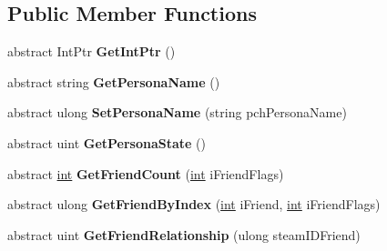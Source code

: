 \subsection*{Public Member Functions}
\begin{DoxyCompactItemize}
\item 
\hypertarget{classValve_1_1Steamworks_1_1ISteamFriends_addb8dee234b12715a1f9d60a2076c8b0}{}abstract Int\+Ptr {\bfseries Get\+Int\+Ptr} ()\label{classValve_1_1Steamworks_1_1ISteamFriends_addb8dee234b12715a1f9d60a2076c8b0}

\item 
\hypertarget{classValve_1_1Steamworks_1_1ISteamFriends_a2e4a7aa02bb0b7a4a651fda2425796df}{}abstract string {\bfseries Get\+Persona\+Name} ()\label{classValve_1_1Steamworks_1_1ISteamFriends_a2e4a7aa02bb0b7a4a651fda2425796df}

\item 
\hypertarget{classValve_1_1Steamworks_1_1ISteamFriends_a7aa0807c91ae882846cc8d69b2d803cf}{}abstract ulong {\bfseries Set\+Persona\+Name} (string pch\+Persona\+Name)\label{classValve_1_1Steamworks_1_1ISteamFriends_a7aa0807c91ae882846cc8d69b2d803cf}

\item 
\hypertarget{classValve_1_1Steamworks_1_1ISteamFriends_a119f400db8b21a57103441da835ad509}{}abstract uint {\bfseries Get\+Persona\+State} ()\label{classValve_1_1Steamworks_1_1ISteamFriends_a119f400db8b21a57103441da835ad509}

\item 
\hypertarget{classValve_1_1Steamworks_1_1ISteamFriends_aaa81d3f377380a8c459816e7ea03d88c}{}abstract \hyperlink{SDL__thread_8h_a6a64f9be4433e4de6e2f2f548cf3c08e}{int} {\bfseries Get\+Friend\+Count} (\hyperlink{SDL__thread_8h_a6a64f9be4433e4de6e2f2f548cf3c08e}{int} i\+Friend\+Flags)\label{classValve_1_1Steamworks_1_1ISteamFriends_aaa81d3f377380a8c459816e7ea03d88c}

\item 
\hypertarget{classValve_1_1Steamworks_1_1ISteamFriends_afcce033a23dd98f7820274dca185e1f6}{}abstract ulong {\bfseries Get\+Friend\+By\+Index} (\hyperlink{SDL__thread_8h_a6a64f9be4433e4de6e2f2f548cf3c08e}{int} i\+Friend, \hyperlink{SDL__thread_8h_a6a64f9be4433e4de6e2f2f548cf3c08e}{int} i\+Friend\+Flags)\label{classValve_1_1Steamworks_1_1ISteamFriends_afcce033a23dd98f7820274dca185e1f6}

\item 
\hypertarget{classValve_1_1Steamworks_1_1ISteamFriends_a2b0f6b75ea9f11c44cc226f3cfaafd82}{}abstract uint {\bfseries Get\+Friend\+Relationship} (ulong steam\+I\+D\+Friend)\label{classValve_1_1Steamworks_1_1ISteamFriends_a2b0f6b75ea9f11c44cc226f3cfaafd82}


\end{DoxyCompactItemize}
